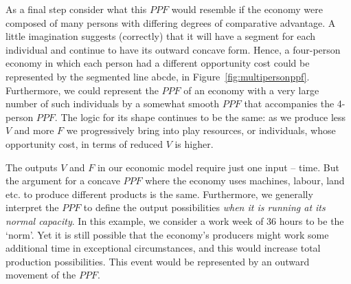As a final step consider what this $PPF$ would resemble if the economy were composed of many persons with differing degrees of comparative advantage. A little imagination suggests (correctly) that it will have a segment for each individual and continue to have its outward concave form. Hence, a four-person economy in which each person had a different opportunity cost could be represented by the segmented line abcde, in Figure~\ref{fig:multipersonppf}. Furthermore, we could represent the $PPF$ of an economy with a very large number of such individuals by a somewhat smooth $PPF$ that accompanies the 4-person $PPF$. The logic for its shape continues to be the same: as we produce less $V$ and more $F$ we progressively bring into play resources, or individuals, whose opportunity cost, in terms of reduced $V$ is higher.



The outputs $V$ and $F$ in our economic model require just one input -- time. But the argument for a concave $PPF$ where the economy uses machines, labour, land etc. to produce different products is the same. Furthermore, we generally interpret the $PPF$ to define the output possibilities \textit{when it is running at its normal capacity}. In this example, we consider a work week of 36 hours to be the `norm'. Yet it is still possible that the economy's producers might work some additional time in exceptional circumstances, and this would increase total production possibilities. This event would be represented by an outward movement of the $PPF$.
